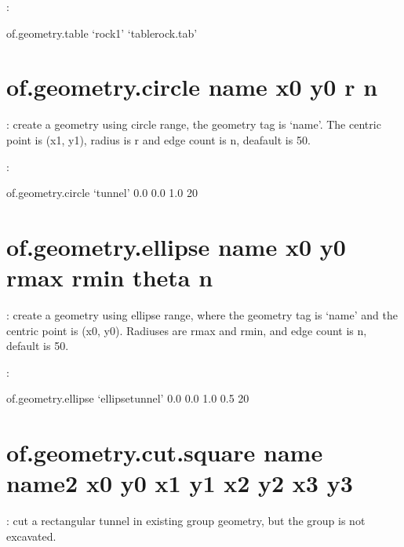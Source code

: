 \documentclass[letterpaper,10pt,english]{sphinxmanual}
\begin{document}
:

\begin{sphinxVerbatim}[commandchars=\\\{\}]
of.geometry.table ‘rock1’ ‘tablerock.tab’
\end{sphinxVerbatim}


\section{of.geometry.circle name x0 y0 r n}
\label{\detokenize{rst_tutorials/command_line_guide:of-geometry-circle-name-x0-y0-r-n}}
: create a geometry using circle range, the geometry tag is
‘name’. The centric point is (x1, y1), radius is r and edge count is n, deafault is 50.

:

\begin{sphinxVerbatim}[commandchars=\\\{\}]
of.geometry.circle ‘tunnel’ 0.0 0.0 1.0 20
\end{sphinxVerbatim}


\section{of.geometry.ellipse name x0 y0 rmax rmin theta n}
\label{\detokenize{rst_tutorials/command_line_guide:of-geometry-ellipse-name-x0-y0-rmax-rmin-theta-n}}
: create a geometry using ellipse range, where the geometry tag is
‘name’ and the centric point is (x0, y0). Radiuses are rmax and rmin,
and edge count is n, default is 50.

:

\begin{sphinxVerbatim}[commandchars=\\\{\}]
of.geometry.ellipse ‘ellipsetunnel’ 0.0 0.0 1.0 0.5 20
\end{sphinxVerbatim}


\section{of.geometry.cut.square name name2 x0 y0 x1 y1 x2 y2 x3 y3}
\label{\detokenize{rst_tutorials/command_line_guide:of-geometry-cut-square-name-name2-x0-y0-x1-y1-x2-y2-x3-y3}}
: cut a rectangular tunnel in existing  group geometry,
but the  group is not excavated.
\end{document}
